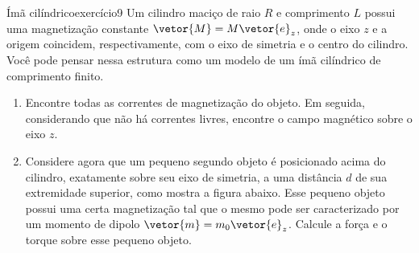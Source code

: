 \begin{exercício}{Ímã cilíndrico}{exercício9}
    Um cilindro maciço de raio \(R\) e comprimento \(L\) possui uma magnetização constante \(\vetor{M} = M \vetor{e}_z\), onde o eixo \(z\) e a origem coincidem, respectivamente, com o eixo de simetria e o centro do cilindro. Você pode pensar nessa estrutura como um modelo de um ímã cilíndrico de comprimento finito.
    \begin{enumerate}[label=(\alph*)]
        \item Encontre todas as correntes de magnetização do objeto. Em seguida, considerando que não há correntes livres, encontre o campo magnético sobre o eixo \(z\).
        \item Considere agora que um pequeno segundo objeto é posicionado acima do cilindro, exatamente sobre seu eixo de simetria, a uma distância \(d\) de sua extremidade superior, como mostra a figura abaixo. Esse pequeno objeto possui uma certa magnetização tal que o mesmo pode ser caracterizado por um momento de dipolo \(\vetor{m} = m_0 \vetor{e}_z\). Calcule a força e o torque sobre esse pequeno objeto.

    \begin{center}
\end{center}
\end{enumerate}
\end{exercício}
